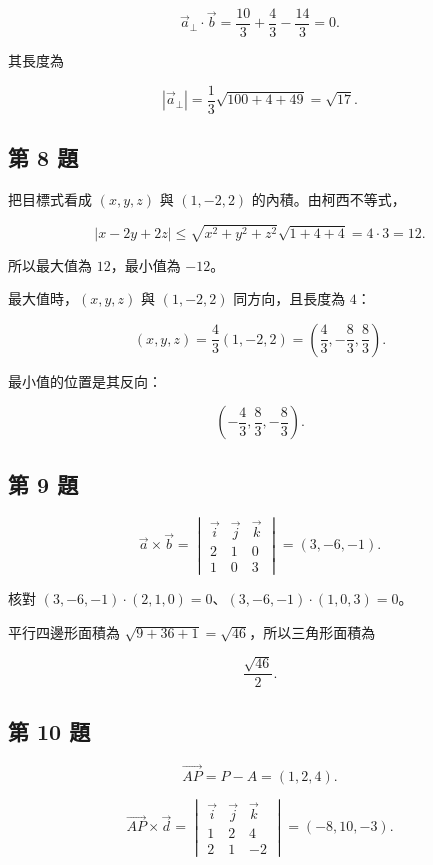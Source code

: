 \documentclass[11pt,a4paper]{article}
\begin{document}
\[
\vec a_\perp\cdot\vec b
=\frac{10}3+\frac43-\frac{14}3=0.
\]

其長度為

\[
|\vec a_\perp|
=\frac13\sqrt{100+4+49}
=\boxed{\sqrt{17}}.
\]

\subsection{第 8 題}\label{ux7b2c-8-ux984c}

把目標式看成 \((x,y,z)\) 與 \((1,-2,2)\) 的內積。由柯西不等式，

\[
|x-2y+2z|
\le\sqrt{x^2+y^2+z^2}\sqrt{1+4+4}
=4\cdot3=12.
\]

所以最大值為 \(12\)，最小值為 \(-12\)。

最大值時，\((x,y,z)\) 與 \((1,-2,2)\) 同方向，且長度為 \(4\)：

\[
(x,y,z)=\frac43(1,-2,2)
=\left(\frac43,-\frac83,\frac83\right).
\]

最小值的位置是其反向：

\[
\boxed{\left(-\frac43,\frac83,-\frac83\right)}.
\]

\subsection{第 9 題}\label{ux7b2c-9-ux984c}

\[
\vec a\times\vec b
=
\begin{vmatrix}
\vec i&\vec j&\vec k\\
2&1&0\\
1&0&3
\end{vmatrix}
=(3,-6,-1).
\]

核對 \((3,-6,-1)\cdot(2,1,0)=0\)、\((3,-6,-1)\cdot(1,0,3)=0\)。

平行四邊形面積為 \(\sqrt{9+36+1}=\sqrt{46}\)，所以三角形面積為

\[
\boxed{\frac{\sqrt{46}}2}.
\]

\subsection{第 10 題}\label{ux7b2c-10-ux984c}

\[
\overrightarrow{AP}=P-A=(1,2,4).
\]

\[
\overrightarrow{AP}\times\vec d
=
\begin{vmatrix}
\vec i&\vec j&\vec k\\
1&2&4\\
2&1&-2
\end{vmatrix}
=(-8,10,-3).
\]
\end{document}
